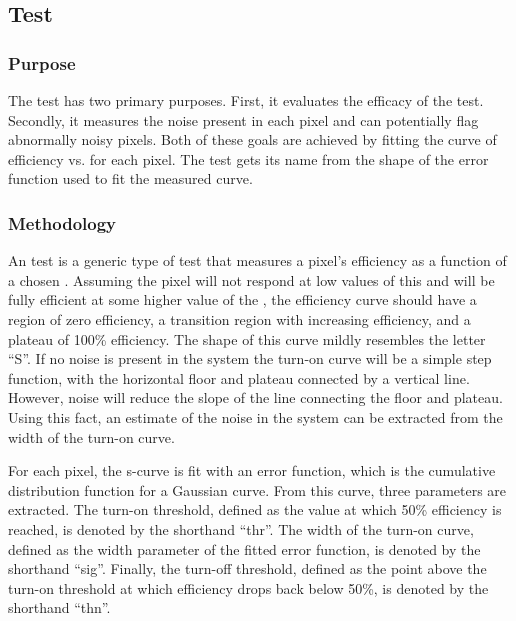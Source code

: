 
\newpage

\subsection{\scurves Test}
\label{ss:scurves}

\subsubsection{Purpose}

The \scurves test has two primary purposes.
First, it evaluates the efficacy of the \trimming test.
Secondly, it measures the noise present in each pixel and can potentially flag abnormally noisy pixels.
Both of these goals are achieved by fitting the curve of efficiency vs. \vcal for each pixel.
The test gets its name from the shape of the error function used to fit the measured curve.

\subsubsection{Methodology}

An \scurves test is a generic type of test that measures a pixel's efficiency as a function of a chosen \dac.
Assuming the pixel will not respond at low values of this \dac and will be fully efficient at some higher value of the \dac,
the efficiency curve should have a region of zero efficiency, 
a transition region with increasing efficiency, and a plateau of 100\% efficiency.
The shape of this curve mildly resembles the letter ``S''.
If no noise is present in the system the turn-on curve will be a simple step function, 
with the horizontal floor and plateau connected by a vertical line.
However, noise will reduce the slope of the line connecting the floor and plateau.
Using this fact, an estimate of the noise in the system can be extracted from the width of the turn-on curve.

For each pixel, the s-curve is fit with an error function, which is the cumulative distribution function for a Gaussian curve.
From this curve, three parameters are extracted.
The turn-on threshold, defined as the \dac value at which 50\% efficiency is reached, is denoted by the shorthand ``thr''.
The width of the turn-on curve, defined as the width parameter of the fitted error function, is denoted by the shorthand ``sig''.
Finally, the turn-off threshold, 
defined as the point above the turn-on threshold at which efficiency drops back below 50\%, is denoted by the shorthand ``thn''.

